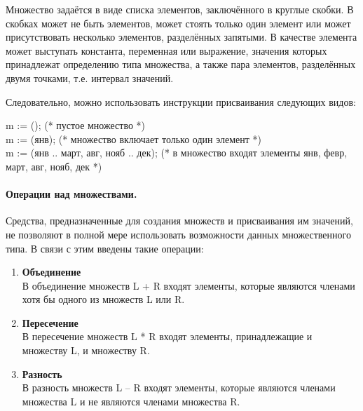 \documentclass[10pt]{report}
\begin{document}
Множество задаётся в виде списка элементов, заключённого в круглые скобки. В скобках может не быть элементов, может стоять только один элемент или может присутствовать несколько
элементов, разделённых запятыми. В качестве элемента может выступать константа, переменная или выражение, значения которых принадлежат определению типа множества, а также пара элементов, разделённых двумя точками, т.е. интервал значений.

Следовательно, можно использовать инструкции присваивания следующих видов:
\begin{flushleft}
\hspace*{5mm} m := (); (* пустое множество *) \\
\hspace*{5mm} m := (янв); (* множество включает только один элемент *) \\
\hspace*{5mm} m := (янв .. март, авг, нояб .. дек); (* в множество входят элементы янв, февр, март, авг, \hspace*{5mm} нояб, дек *) \\
\end{flushleft}

\paragraph{Операции над множествами.}
Средства, предназначенные для создания множеств и присваивания им значений, не позволяют в полной мере использовать возможности данных множественного типа. В связи с этим введены такие операции:
\begin{enumerate}
\item
\textbf{Объединение}\\
В объединение множеств L + R входят элементы, которые являются членами хотя бы одного из множеств L или R.
\item
\textbf{Пересечение}\\
В пересечение множеств L * R входят элементы, принадлежащие и множеству L, и множеству R.
\item
\textbf{Разность}\\
В разность множеств L -- R входят элементы, которые являются членами множества L и не являются членами множества R.
\end{enumerate}
\end{document}
